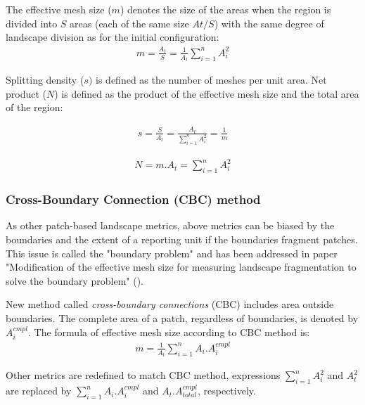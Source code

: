 \documentclass[11pt]{article}
\newcommand{\mycite}[1]{ (\cite{#1})}
\begin{document}
The effective mesh size ($m$) denotes the size of the areas when the region is divided into $S$ areas (each of the same size $At/S$) with the same degree of landscape division as for the initial configuration:
\begin{align*}
m = \frac{A_{t}}{S} = \frac{1}{A_{t}}\sum_{i=1}^{n}A_{i}^{2}
\end{align*}

Splitting density ($s)$ is defined as the number of meshes per unit area.
Net product ($N$) is defined as the product of the effective mesh size and the total area of the region:

\hspace*{-0.5cm}
\begin{minipage}[c][1cm]{.46\linewidth}
\begin{align*}
s = \frac{S}{A_{t}} = \frac{A_{t}}{\sum_{i=1}^{n}A_{i}^{2}} = \frac{1}{m}
\end{align*}
\end{minipage}
\begin{minipage}[c][1cm]{.46\linewidth}
\begin{align*}
N = m.{A_{t}} = \sum_{i=1}^{n}A_{i}^{2}
\end{align*}
\end{minipage}


\subsubsection{Cross-Boundary Connection (CBC) method}
\label{sec:cbc}

As other patch-based landscape metrics, above metrics can be biased by the boundaries and the extent of a reporting unit if the boundaries fragment patches. This issue is called the "boundary problem" and has been addressed  in paper "Modification of the effective mesh size for measuring landscape fragmentation to solve the boundary problem"\mycite{moser}.

New method called \textit{cross-boundary connections} (CBC) includes area outside boundaries. The complete area of a patch, regardless of boundaries, is denoted by $A_{i}^{cmpl}$. The formula of effective mesh size according to CBC method is:
\begin{align*}
m = \frac{1}{A_{t}}\sum_{i=1}^{n}A_{i}.A_{i}^{cmpl}
\end{align*}

Other metrics are redefined to match CBC method, expressions $\sum_{i=1}^{n}A_{i}^{2}$ and $A_{t}^{2}$ are replaced by $\sum_{i=1}^{n}A_{i}.A_{i}^{cmpl}$ and $A_{t}.A_{total}^{cmpl}$, respectively.
\end{document}
